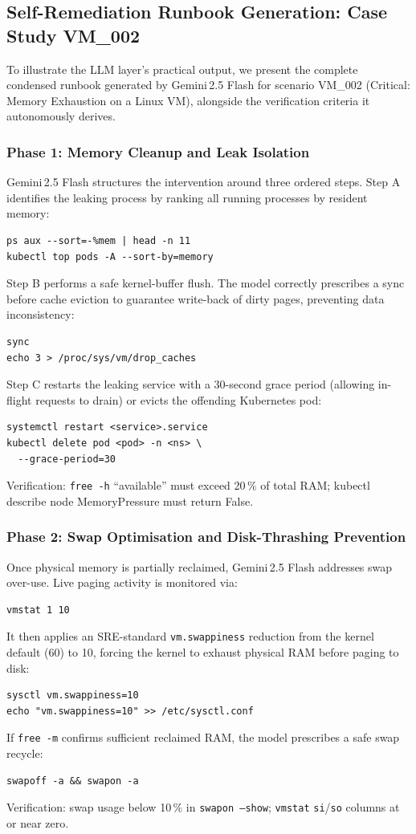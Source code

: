 \documentclass[5p, times]{elsarticle}
\begin{document}
\subsection{Self-Remediation Runbook Generation: Case Study VM\_002}

To illustrate the LLM layer's practical output, we present the complete condensed runbook generated by Gemini\,2.5 Flash for scenario VM\_002 (Critical: Memory Exhaustion on a Linux VM), alongside the verification criteria it autonomously derives.

\subsubsection{Phase 1: Memory Cleanup and Leak Isolation}
Gemini\,2.5 Flash structures the intervention around three ordered steps. Step A identifies the leaking process by ranking all running processes by resident memory:
\begin{verbatim}
ps aux --sort=-%mem | head -n 11
kubectl top pods -A --sort-by=memory
\end{verbatim}
Step B performs a safe kernel-buffer flush. The model
correctly prescribes a sync before cache eviction to
guarantee write-back of dirty pages, preventing data inconsistency:
\begin{verbatim}
sync
echo 3 > /proc/sys/vm/drop_caches
\end{verbatim}
Step C restarts the leaking service with a 30-second
grace period (allowing in-flight requests to drain) or evicts the offending Kubernetes pod:
\begin{verbatim}
systemctl restart <service>.service
kubectl delete pod <pod> -n <ns> \
  --grace-period=30
\end{verbatim}
Verification: \texttt{free -h} ``available'' must exceed 20\,\% of total RAM; kubectl describe node
MemoryPressure must return False.

\subsubsection{Phase 2: Swap Optimisation and Disk-Thrashing Prevention}
Once physical memory is partially reclaimed, Gemini\,2.5 Flash addresses swap over-use. Live paging activity is monitored via:
\begin{verbatim}
vmstat 1 10
\end{verbatim}
It then applies an SRE-standard \texttt{vm.swappiness} reduction
from the kernel default (60) to 10, forcing the kernel to exhaust
physical RAM before paging to disk:
\begin{verbatim}
sysctl vm.swappiness=10
echo "vm.swappiness=10" >> /etc/sysctl.conf
\end{verbatim}
If \texttt{free -m} confirms sufficient reclaimed RAM, the model prescribes a safe swap recycle:
\begin{verbatim}
swapoff -a && swapon -a
\end{verbatim}
Verification: swap usage below 10\,\% in
\texttt{swapon --show}; \texttt{vmstat} \texttt{si}/\texttt{so}
columns at or near zero.
\end{document}
